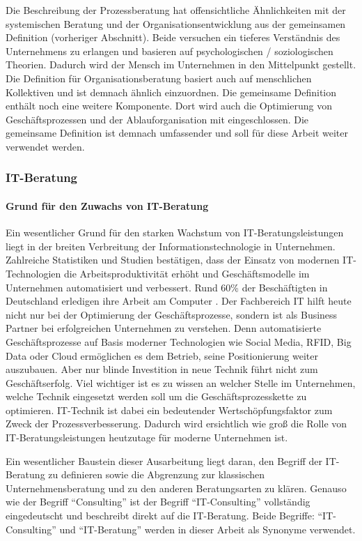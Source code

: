 Die Beschreibung der Prozessberatung hat offensichtliche Ähnlichkeiten mit der systemischen Beratung und der Organisationsentwicklung aus der gemeinsamen Definition (vorheriger Abschnitt). Beide versuchen ein tieferes Verständnis des Unternehmens zu erlangen und basieren auf psychologischen / soziologischen Theorien. Dadurch wird der Mensch im Unternehmen in den Mittelpunkt gestellt.
Die Definition für Organisationsberatung basiert auch auf \grqq menschlichen Kollektiven \glqq und ist demnach ähnlich einzuordnen.
Die gemeinsame Definition enthält noch eine weitere Komponente. Dort wird auch die Optimierung von Geschäftsprozessen und der Ablauforganisation mit eingeschlossen. Die gemeinsame Definition ist demnach umfassender und soll für diese Arbeit weiter verwendet werden. 


\subsubsection*{IT-Beratung}
	\paragraph*{Grund für den Zuwachs von IT-Beratung}
		Ein wesentlicher Grund für den starken Wachstum von IT-Beratungsleistungen liegt in der breiten Verbreitung der Informationstechnologie in Unternehmen. Zahlreiche Statistiken und Studien bestätigen, dass der Einsatz von modernen IT-Technologien die Arbeitsproduktivität erhöht und Geschäftsmodelle im Unternehmen automatisiert und verbessert. Rund 60\% der Beschäftigten in Deutschland  erledigen ihre Arbeit am Computer \cite{IreneBertschek.2011}.
		Der Fachbereich IT hilft heute nicht nur bei der Optimierung der Geschäftsprozesse, sondern ist als Business Partner bei erfolgreichen Unternehmen zu verstehen. Denn automatisierte Geschäftsprozesse auf Basis moderner Technologien wie Social Media, RFID, Big Data oder Cloud  ermöglichen es dem Betrieb, seine Positionierung weiter auszubauen.
		Aber nur blinde Investition in neue Technik führt nicht zum Geschäftserfolg. Viel wichtiger ist es zu wissen an welcher Stelle im Unternehmen, welche Technik eingesetzt werden soll um die Geschäftsprozesskette zu optimieren. IT-Technik ist dabei ein bedeutender Wertschöpfungsfaktor zum Zweck der Prozessverbesserung.
		Dadurch wird ersichtlich wie groß die Rolle von IT-Beratungsleistungen heutzutage  für moderne Unternehmen ist. 
		
		Ein wesentlicher Baustein dieser Ausarbeitung liegt daran, den Begriff der IT-Beratung  zu definieren sowie die Abgrenzung zur klassischen Unternehmensberatung und zu den anderen Beratungsarten zu klären.
		Genauso wie der Begriff “Consulting” ist der Begriff “IT-Consulting” vollständig eingedeutscht und beschreibt direkt auf die IT-Beratung. Beide Begriffe: “IT-Consulting” und “IT-Beratung” werden in dieser Arbeit als Synonyme verwendet.\\
